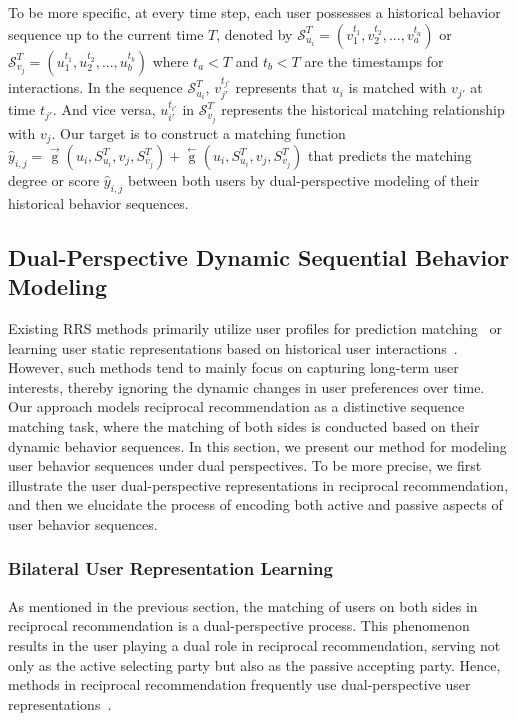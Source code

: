To be more specific, at every time step, each user possesses a historical behavior sequence up to the current time $T$, denoted by $\mathcal{S}^T_{u_i} = (v^{t_1}_1, v^{t_2}_2,..., v^{t_a}_a)$ or $\mathcal{S}^T_{v_j} = (u^{t_1}_1, u^{t_2}_2,..., u^{t_b}_b)$ where $t_a < T$ and $t_b < T$ are the timestamps for interactions. In the sequence $\mathcal{S}^T_{u_i}$, $v^{t_{j'}}_{j'}$ represents that $u_i$ is matched with $v_{j'}$ at time $t_{j'}$. And vice versa, $u^{t_{i'}}_{i'}$ in $\mathcal{S}^T_{v_j}$ represents the historical matching relationship with $v_j$.
Our target is to construct a matching function $\hat{y}_{i,j}=\mathop{g}\limits^{\rightarrow}(u_i, {S}^T_{u_i}, v_j, {S}^T_{v_j}) + \mathop{g}\limits^{\leftarrow}(u_i, {S}^T_{u_i}, v_j, {S}^T_{v_j})$ that predicts the matching degree or score $\hat{y}_{i,j}$ between both users by dual-perspective modeling of their historical behavior sequences.

\subsection{Dual-Perspective Dynamic Sequential Behavior Modeling} 
\label{sec:bhv_model}

Existing RRS methods primarily utilize user profiles for prediction matching~\cite{pizzato2010recon,luo2020rrcn} or learning user static representations based on historical user interactions~\cite{xia2015reciprocal,neve2019latent}.
However, such methods tend to mainly focus on capturing long-term user interests, thereby ignoring the dynamic changes in user preferences over time.
Our approach models reciprocal recommendation as a distinctive sequence matching task, where the matching of both sides is conducted based on their dynamic behavior sequences.
In this section, we present our method for modeling user behavior sequences under dual perspectives.
To be more precise, we first illustrate the user dual-perspective representations in reciprocal recommendation, and then we elucidate the process of encoding both active and passive aspects of user behavior sequences.

\subsubsection{Bilateral User Representation Learning}
As mentioned in the previous section, the matching of users on both sides in reciprocal recommendation is a dual-perspective process.
This phenomenon results in the user playing a dual role in reciprocal recommendation, serving not only as the active selecting party but also as the passive accepting party.
Hence, methods in reciprocal recommendation frequently use dual-perspective user representations~\cite{neve2019latent,yang2022modeling}.
 
